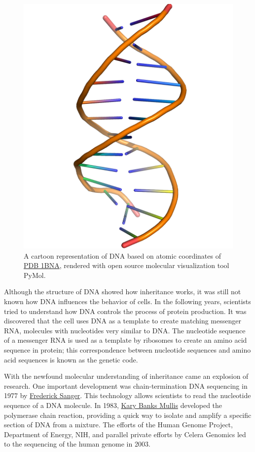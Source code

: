 \begin{figure}

{\centering \includegraphics[width=0.7\linewidth]{./figures/genetics/DNA_cartoon} 

}

\caption{A cartoon representation of DNA based on atomic coordinates of \href{https://www.rcsb.org/structure/1bna}{PDB 1BNA}, rendered with open source molecular visualization tool PyMol.}\label{fig:dnacartoon}
\end{figure}

Although the structure of DNA showed how inheritance works, it was still not known how DNA influences the behavior of cells. In the following years, scientists tried to understand how DNA controls the process of protein production. It was discovered that the cell uses DNA as a template to create matching messenger RNA, molecules with nucleotides very similar to DNA. The nucleotide sequence of a messenger RNA is used as a template by ribosomes to create an amino acid sequence in protein; this correspondence between nucleotide sequences and amino acid sequences is known as the genetic code.

With the newfound molecular understanding of inheritance came an explosion of research. One important development was chain-termination DNA sequencing in 1977 by \href{https://en.wikipedia.org/wiki/Frederick_Sanger}{Frederick Sanger}. This technology allows scientists to read the nucleotide sequence of a DNA molecule. In 1983, \href{https://en.wikipedia.org/wiki/Kary_Mullis}{Kary Banks Mullis} developed the polymerase chain reaction, providing a quick way to isolate and amplify a specific section of DNA from a mixture. The efforts of the Human Genome Project, Department of Energy, NIH, and parallel private efforts by Celera Genomics led to the sequencing of the human genome in 2003.

